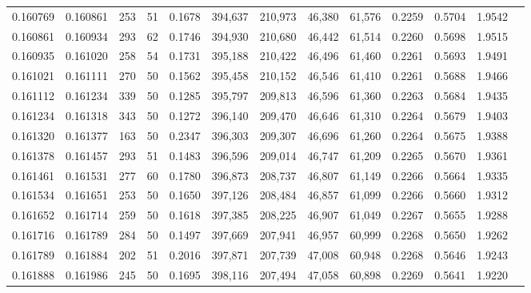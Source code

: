 \begin{tabular}{rrrrrrrrrrrrr}
0.160769 & 0.160861 &   253 &  51 &                                     0.1678 & 394,637 & 210,973 &  46,380 &  61,576 & 0.2259 & 0.5704 & 1.9542 \\
0.160861 & 0.160934 &   293 &  62 &                                     0.1746 & 394,930 & 210,680 &  46,442 &  61,514 & 0.2260 & 0.5698 & 1.9515 \\
0.160935 & 0.161020 &   258 &  54 &                                     0.1731 & 395,188 & 210,422 &  46,496 &  61,460 & 0.2261 & 0.5693 & 1.9491 \\
0.161021 & 0.161111 &   270 &  50 &                                     0.1562 & 395,458 & 210,152 &  46,546 &  61,410 & 0.2261 & 0.5688 & 1.9466 \\
0.161112 & 0.161234 &   339 &  50 &                                     0.1285 & 395,797 & 209,813 &  46,596 &  61,360 & 0.2263 & 0.5684 & 1.9435 \\
0.161234 & 0.161318 &   343 &  50 &                                     0.1272 & 396,140 & 209,470 &  46,646 &  61,310 & 0.2264 & 0.5679 & 1.9403 \\
0.161320 & 0.161377 &   163 &  50 &                                     0.2347 & 396,303 & 209,307 &  46,696 &  61,260 & 0.2264 & 0.5675 & 1.9388 \\
0.161378 & 0.161457 &   293 &  51 &                                     0.1483 & 396,596 & 209,014 &  46,747 &  61,209 & 0.2265 & 0.5670 & 1.9361 \\
0.161461 & 0.161531 &   277 &  60 &                                     0.1780 & 396,873 & 208,737 &  46,807 &  61,149 & 0.2266 & 0.5664 & 1.9335 \\
0.161534 & 0.161651 &   253 &  50 &                                     0.1650 & 397,126 & 208,484 &  46,857 &  61,099 & 0.2266 & 0.5660 & 1.9312 \\
0.161652 & 0.161714 &   259 &  50 &                                     0.1618 & 397,385 & 208,225 &  46,907 &  61,049 & 0.2267 & 0.5655 & 1.9288 \\
0.161716 & 0.161789 &   284 &  50 &                                     0.1497 & 397,669 & 207,941 &  46,957 &  60,999 & 0.2268 & 0.5650 & 1.9262 \\
0.161789 & 0.161884 &   202 &  51 &                                     0.2016 & 397,871 & 207,739 &  47,008 &  60,948 & 0.2268 & 0.5646 & 1.9243 \\
0.161888 & 0.161986 &   245 &  50 &                                     0.1695 & 398,116 & 207,494 &  47,058 &  60,898 & 0.2269 & 0.5641 & 1.9220 \\

\end{tabular}
